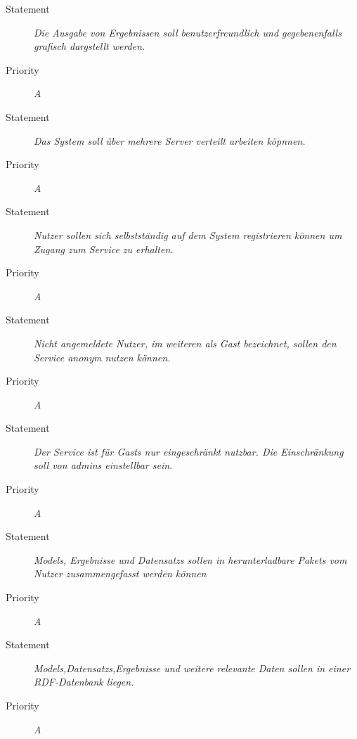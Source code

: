 \UR
\begin{description}
	\item[Statement] \textit{Die Ausgabe von Ergebnissen soll benutzerfreundlich und gegebenenfalls grafisch dargstellt werden.}
	\item[Priority] \textit{A}
\end{description}

\UR
\begin{description}
	\item[Statement] \textit{Das System soll über mehrere Server verteilt arbeiten köpnnen.}
	\item[Priority] \textit{A}
\end{description}


\UR
\begin{description}
	\item[Statement] \textit{Nutzer sollen sich selbstständig auf dem System registrieren können um Zugang zum Service zu erhalten.}
	\item[Priority] \textit{A}
\end{description}

\UR
\begin{description}
	\item[Statement] \textit{Nicht angemeldete Nutzer, im weiteren als \gls{Gast} bezeichnet, sollen den Service anonym nutzen können.}
	\item[Priority] \textit{A}
\end{description}

\UR
\begin{description}
	\item[Statement] \textit{Der Service ist für \glspl{Gast} nur eingeschränkt nutzbar. Die Einschränkung soll von \glspl{admin} einstellbar sein.}
	\item[Priority] \textit{A}
\end{description}

\UR
\begin{description}
	\item[Statement] \textit{\glspl{Model}, Ergebnisse und \glspl{Datensatz} sollen in  herunterladbare \glspl{Paket} vom Nutzer zusammengefasst werden können}%
	\item[Priority] \textit{A}
\end{description}

\UR
\begin{description}
	\item[Statement] \textit{\glspl{Model},\glspl{Datensatz},Ergebnisse und weitere relevante Daten sollen in einer \gls{RDF}-Datenbank liegen.}%
	\item[Priority] \textit{A}
\end{description}

